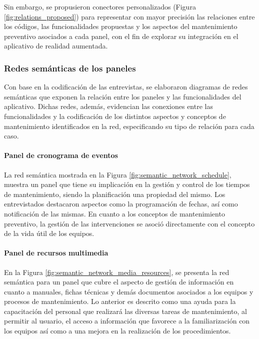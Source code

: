         Sin embargo, se propusieron conectores personalizados (Figura \ref{fig:relations_proposed}) para representar con mayor precisión las relaciones entre los códigos, las funcionalidades propuestas y los aspectos del mantenimiento preventivo asociados a cada panel, con el fin de explorar su integración en el aplicativo de realidad aumentada.
        
        

        \subsubsection{Redes semánticas de los paneles}

            Con base en la codificación de las entrevistas, se elaboraron diagramas de redes semánticas que exponen la relación entre los paneles y las funcionalidades del aplicativo. Dichas redes, además, evidencian las conexiones entre las funcionalidades y la codificación de los distintos aspectos y conceptos de mantenimiento identificados en la red, especificando su tipo de relación para cada caso.
            
            \paragraph{Panel de cronograma de eventos}
            
                La red semántica mostrada en la Figura \ref{fig:semantic_network_schedule}, muestra un panel que tiene su implicación en la gestión y control de los tiempos de mantenimiento, siendo la planificación una propiedad del mismo. Los entrevistados destacaron aspectos como la programación de fechas, así como notificación de las mismas. En cuanto a los conceptos de mantenimiento preventivo, la gestión de las intervenciones se asoció directamente con el concepto de la vida útil de los equipos.

                

            \paragraph{Panel de recursos multimedia}
            
                En la Figura \ref{fig:semantic_network_media_resources}, se presenta la red semántica para un panel que cubre el aspecto de gestión de información en cuanto a manuales, fichas técnicas y demás documentos asociados a los equipos y procesos de mantenimiento. Lo anterior es descrito como una ayuda para la capacitación del personal que realizará las diversas tareas de mantenimiento, al permitir al usuario, el acceso a información que favorece a la familiarización con los equipos así como a una mejora en la realización de los procedimientos.

